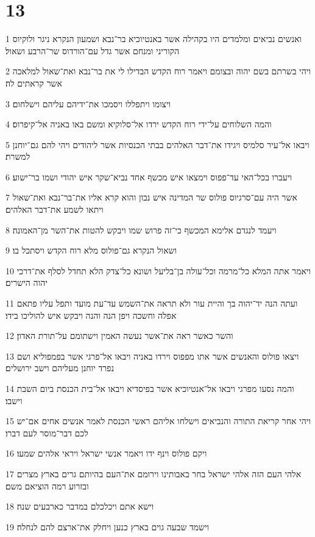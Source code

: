 \chapter{13}

\par 1 ואנשים נביאים ומלמדים היו בקהילה אשר באנטיוכיא בר־נבא ושמעון הנקרא ניגר ולוקיוס הקוריני ומנחם אשר גדל עם־הורדוס שר־הרבע ושאול׃
\par 2 ויהי בשרתם בשם יהוה ובצומם ויאמר רוח הקדש הבדילו לי את בר־נבא ואת־שאול למלאכה אשר קראתים לה׃
\par 3 ויצומו ויתפללו ויסמכו את־ידיהם עליהם וישלחום׃
\par 4 והמה השלוחים על־ידי רוח הקדש ירדו אל־סלוקיא ומשם באו באניה אל־קיפרוס׃
\par 5 ויבאו אל־עיר סלמיס ויגידו את־דבר האלהים בבתי הכנסיות אשר ליהודים ויהי להם גם־יוחנן למשרת׃
\par 6 ויעברו בכל־האי עד־פפוס וימצאו איש מכשף אחד נביא־שקר איש יהודי ושמו בר־ישוע׃
\par 7 אשר היה עם־סרגיוס פולוס שר המדינה איש נבון והוא קרא אליו את־בר־נבא ואת־שאול ויתאו לשמע את־דבר האלהים׃
\par 8 ויעמד לנגדם אלימא המכשף כי־זה פרוש שמו ויבקש להטות את־השר מן־האמונה׃
\par 9 ושאול הנקרא גם־פולוס מלא רוח הקדש ויסתכל בו׃
\par 10 ויאמר אתה המלא כל־מרמה וכל־עולה בן־בליעל ושונא כל־צדק הלא תחדל לסלף את־דרכי יהוה הישרים׃
\par 11 ועתה הנה יד־יהוה בך והיית עור ולא תראה את־השמש עד־עת מועד ותפל עליו פתאם אפלה וחשכה ויפן הנה והנה ויבקש איש להוליכו בידו׃
\par 12 והשר כאשר ראה את־אשר נעשה האמין וישתומם על־תורת האדון׃
\par 13 ויצאו פולוס והאנשים אשר אתו מפפוס וירדו באניה ויבאו אל־פרגי אשר בפמפוליא ושם נפרד יוחנן מעליהם וישב ירושלים׃
\par 14 והמה נסעו מפרגי ויבאו אל־אנטיוכיא אשר בפיסדיא ויבאו אל־בית הכנסת ביום השבת וישבו׃
\par 15 ויהי אחר קריאת התורה והנביאים וישלחו אליהם ראשי הכנסת לאמר אנשים אחים אם־יש לכם דבר־מוסר לעם דברו׃
\par 16 ויקם פולוס וינף ידו ויאמר אנשי ישראל ויראי אלהים שמעו׃
\par 17 אלהי העם הזה אלהי ישראל בחר באבותינו וירומם את־העם בהיותם גרים בארץ מצרים ובזרוע רמה הוציאם משם׃
\par 18 וישא אתם ויכלכלם במדבר כארבעים שנה׃
\par 19 וישמד שבעה גוים בארץ כנען ויחלק את־ארצם להם לנחלה׃
